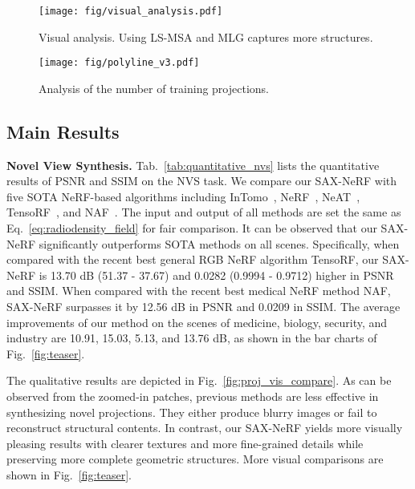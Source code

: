 \documentclass[10pt,twocolumn,letterpaper]{article}
\begin{document}
\begin{figure*}[t]
	\centering
	\hspace{-3.6mm}
	\begin{minipage}{0.57\textwidth}
		\centering
		\texttt{[image: fig/visual\_analysis.pdf]} 
		\caption{Visual analysis. Using LS-MSA and MLG  captures more structures.}
		\label{fig:visual_analysis}
	\end{minipage}\hspace{0.5mm}
	\begin{minipage}{0.43\textwidth}
		\centering
		\texttt{[image: fig/polyline\_v3.pdf]} 
		\vspace{-5.5mm}
		\caption{Analysis of the number of training projections.}
		\label{fig:proj_num}
	\end{minipage}
	\vspace{-2.5mm}
\end{figure*}

\subsection{Main Results}

\noindent\textbf{Novel View Synthesis.} Tab.~\ref{tab:quantitative_nvs} lists the quantitative results of PSNR and SSIM on the NVS task.  
We compare our SAX-NeRF with five SOTA NeRF-based algorithms including InTomo~\cite{intratomo}, NeRF~\cite{nerf}, NeAT~\cite{neat}, TensoRF~\cite{tensorf}, and NAF~\cite{naf}. The input and output of all methods are set the same as Eq.~\eqref{eq:radiodensity_field} for fair comparison. It can be observed that our SAX-NeRF significantly outperforms SOTA methods on all scenes. Specifically, when compared with the recent best general RGB NeRF algorithm TensoRF, our SAX-NeRF is 13.70 dB (51.37 - 37.67) and 0.0282 (0.9994 - 0.9712) higher in PSNR and SSIM. When compared with the recent best medical NeRF method NAF, SAX-NeRF surpasses it by 12.56 dB in PSNR and 0.0209 in SSIM. The average improvements of our method on the scenes of medicine, biology, security, and industry are 10.91, 15.03, 5.13, and 13.76 dB, as shown in the bar charts of Fig.~\ref{fig:teaser}. 

The qualitative results are depicted in Fig.~\ref{fig:proj_vis_compare}. As can be observed from the zoomed-in patches, previous methods are less effective in synthesizing novel projections. They either produce blurry images or fail to reconstruct structural contents. In contrast, our SAX-NeRF yields more visually pleasing results with clearer textures and more fine-grained details while preserving more complete geometric structures. More visual comparisons are shown in Fig.~\ref{fig:teaser}.
\end{document}
